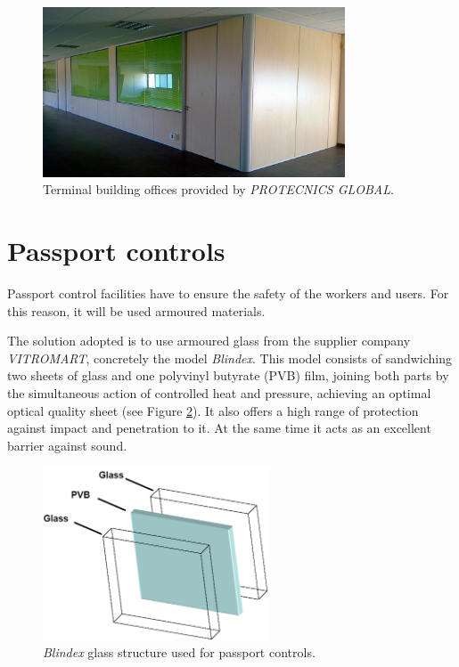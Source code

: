 \begin{figure}[H]
	\centering
	\includegraphics[clip, trim=0cm 0cm 0cm 0cm, width=0.8\textwidth]{./images/indoorclosures/offices}
	\caption{Terminal building offices provided by \textit{PROTECNICS GLOBAL}.}
	\label{offices}
\end{figure}


	\section{Passport controls}
Passport control facilities have to ensure the safety of the workers and users. For this reason, it will be used armoured materials. 

The solution adopted is to use armoured glass from the supplier company \textit{VITROMART\textregistered{}}, concretely the model \textit{Blindex\textregistered{}}. This model consists of sandwiching two sheets of glass and one polyvinyl butyrate (PVB) film, joining both parts by the simultaneous action of controlled heat and pressure, achieving an optimal optical quality sheet (see Figure \ref{passport}). It also offers a high range of protection against impact and penetration to it. At the same time it acts as an excellent barrier against sound.

\begin{figure}[H]
	\centering
	\includegraphics[clip, trim=0cm 0cm 0cm 0cm, width=0.6\textwidth]{./images/indoorclosures/passport}
	\caption{\textit{Blindex\textregistered{}} glass structure used for passport controls.}
		\label{passport}
	\end{figure}

